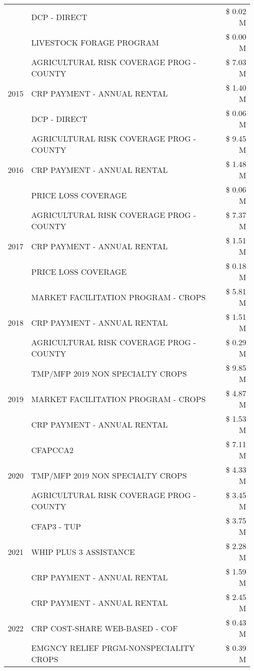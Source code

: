 \begin{tabular}{llr}
 & DCP - DIRECT & \$ 0.02 M \\
 & LIVESTOCK FORAGE PROGRAM & \$ 0.00 M \\
\cline{1-3}
\multirow[t]{3}{*}{2015} & AGRICULTURAL RISK COVERAGE PROG - COUNTY & \$ 7.03 M \\
 & CRP PAYMENT - ANNUAL RENTAL & \$ 1.40 M \\
 & DCP - DIRECT & \$ 0.06 M \\
\cline{1-3}
\multirow[t]{3}{*}{2016} & AGRICULTURAL RISK COVERAGE PROG - COUNTY & \$ 9.45 M \\
 & CRP PAYMENT - ANNUAL RENTAL & \$ 1.48 M \\
 & PRICE LOSS COVERAGE & \$ 0.06 M \\
\cline{1-3}
\multirow[t]{3}{*}{2017} & AGRICULTURAL RISK COVERAGE PROG - COUNTY & \$ 7.37 M \\
 & CRP PAYMENT - ANNUAL RENTAL & \$ 1.51 M \\
 & PRICE LOSS COVERAGE & \$ 0.18 M \\
\cline{1-3}
\multirow[t]{3}{*}{2018} & MARKET FACILITATION PROGRAM - CROPS & \$ 5.81 M \\
 & CRP PAYMENT - ANNUAL RENTAL & \$ 1.51 M \\
 & AGRICULTURAL RISK COVERAGE PROG - COUNTY & \$ 0.29 M \\
\cline{1-3}
\multirow[t]{3}{*}{2019} & TMP/MFP 2019 NON SPECIALTY CROPS & \$ 9.85 M \\
 & MARKET FACILITATION PROGRAM - CROPS & \$ 4.87 M \\
 & CRP PAYMENT - ANNUAL RENTAL & \$ 1.53 M \\
\cline{1-3}
\multirow[t]{3}{*}{2020} & CFAPCCA2 & \$ 7.11 M \\
 & TMP/MFP 2019 NON SPECIALTY CROPS & \$ 4.33 M \\
 & AGRICULTURAL RISK COVERAGE PROG - COUNTY & \$ 3.45 M \\
\cline{1-3}
\multirow[t]{3}{*}{2021} & CFAP3 - TUP & \$ 3.75 M \\
 & WHIP PLUS 3 ASSISTANCE & \$ 2.28 M \\
 & CRP PAYMENT - ANNUAL RENTAL & \$ 1.59 M \\
\cline{1-3}
\multirow[t]{3}{*}{2022} & CRP PAYMENT - ANNUAL RENTAL & \$ 2.45 M \\
 & CRP COST-SHARE WEB-BASED - COF & \$ 0.43 M \\
 & EMGNCY RELIEF PRGM-NONSPECIALITY CROPS & \$ 0.39 M \\
\cline{1-3}
\bottomrule
\end{tabular}
